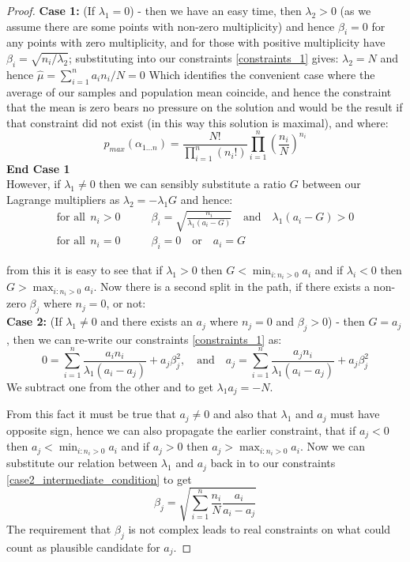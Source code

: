 \documentclass[12pt]{colt2020} %
\begin{document}
\begin{proof}
\textbf{Case 1:} (If $\lambda_1=0$) - then we have an easy time, then $\lambda_2>0$ (as we assume there are some points with non-zero multiplicity) and hence $\beta_i=0$ for any points with zero multiplicity, and for those with positive multiplicity have $\beta_i=\sqrt{n_i/\lambda_2}$; substituting into our constraints \eqref{constraints_1} gives: $\lambda_2 = N$ and hence $\hat{\mu}=\sum_{i=1}^na_in_i/N = 0$
Which identifies the convenient case where the average of our samples and population mean coincide, and hence the constraint that the mean is zero bears no pressure on the solution and would be the result if that constraint did not exist (in this way this solution is maximal), and where:
\begin{equation}\label{case1_solution}p_{max}(\alpha_{1\dots n}) = \frac{N!}{\prod_{i=1}^n(n_i!)}\prod_{i=1}^n \left(\frac{n_i}{N}\right)^{n_i} \end{equation}\textbf{End Case 1}\\

However, if $\lambda_1\ne 0$ then we can sensibly substitute a ratio $G$ between our Lagrange multipliers as $\lambda_2=-\lambda_1G$ and hence:
\begin{align*}\text{for all}~~n_i>0\quad\quad &\beta_i = \sqrt{\frac{n_i}{\lambda_1 (a_i -G)}} \quad \text{and} \quad \lambda_1 (a_i-G) > 0 \\
\text{for all}~~n_i=0\quad\quad &\beta_i = 0 \quad \text{or} \quad a_i=G \end{align*}

from this it is easy to see that if $\lambda_1>0$ then $G<\min_{i:n_i>0}a_i$ and if $\lambda_i<0$ then $G>\max_{i:n_i>0}a_i$.
Now there is a second split in the path, if there exists a non-zero $\beta_j$ where $n_j=0$, or not:\\

\textbf{Case 2:} (If $\lambda_1\ne 0$ and there exists an $a_j$ where $n_j=0$ and $\beta_j>0$) -
then $G=a_j$, then we can re-write our constraints \eqref{constraints_1} as:
\begin{equation}\label{case2_intermediate_condition} 0 = \sum_{i=1}^n\frac{a_in_i}{\lambda_1(a_i-a_j)}+a_j\beta_j^2, \quad\text{and}\quad a_j = \sum_{i=1}^n\frac{a_jn_i}{\lambda_1(a_i-a_j)}+a_j\beta_j^2 \end{equation}
We subtract one from the other and to get $\lambda_1a_j=-N$.

From this fact it must be true that $a_j\ne0$ and also that $\lambda_1$ and $a_j$ must have opposite sign, hence we can also propagate the earlier constraint, that if $a_j<0$ then $a_j<\min_{i:n_i>0}a_i$ and if $a_j>0$ then $a_j>\max_{i:n_i>0}a_i$.
Now we can substitute our relation between $\lambda_1$ and $a_j$ back in to our constraints \eqref{case2_intermediate_condition} to get
\begin{equation}\label{case2_condition1} \beta_j =\sqrt{\sum_{i=1}^n\frac{n_i}{N}\frac{a_i}{a_i-a_j}} \end{equation}
The requirement that $\beta_j$ is not complex leads to real constraints on what could count as plausible candidate for $a_j$.


\end{proof}
\end{document}
